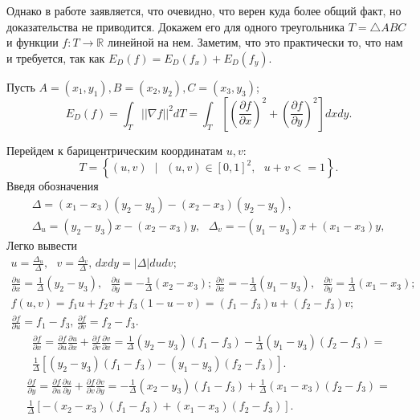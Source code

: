 Однако в работе \cite{Pinkall93} заявляется, что очевидно, что верен куда более общий факт, но доказательства не
приводится. Докажем его для одного треугольника $T = \triangle ABC$ и функции $f: T \to \mathbb{R}$ линейной
на нем. Заметим, что это практически то, что нам и требуется, так как $E_D(f) = E_D(f_x) + E_D(f_y)$. 

Пусть $A=(x_1, y_1), B=(x_2, y_2), C=(x_3, y_3)$; $$E_D(f) = \int_{T}{||\nabla{f}||^2 dT} = 
        \int_{T}{\left[\left(\frac{\partial f}{\partial x}\right)^2 + 
                       \left(\frac{\partial f}{\partial y}\right)^2 \right] dx dy}.$$ 

Перейдем к барицентрическим координатам $u, v$: $$T = \left\{(u, v)\mbox{ } | \mbox{ } (u, v) \in \left[0, 1 \right]^2 ,\mbox{ } u + v <= 1 \right\}.$$ 
Введя обозначения \begin{multline*} \Delta = (x_1 - x_3) (y_2 - y_3) - (x_2 - x_3) (y_2 - y_3), \\ \Delta_u = (y_2 - y_3) x - (x_2 - x_3) y, \mbox{ } \Delta_v = -(y_1 - y_3) x + (x_1 - x_3) y, 
\end{multline*}
Легко вывести
\begin{multline*} u = \frac{\Delta_u}{\Delta}, \mbox{ } v = \frac{\Delta_v}{\Delta} \mbox{, } dxdy = |\Delta| dudv; \\
        \frac{\partial u}{\partial x} = \frac{1}{\Delta}(y_2 - y_3), \mbox{ } \frac{\partial u}{\partial y} = -\frac{1}{\Delta}(x_2 - x_3) \mbox{; }
        \frac{\partial v}{\partial x} = -\frac{1}{\Delta}(y_1 - y_3), \mbox{ } \frac{\partial v}{\partial y} = \frac{1}{\Delta}(x_1 - x_3); \\
        f(u, v) = f_1 u + f_2 v + f_3(1-u-v) = (f_1 - f_3) u + (f_2 - f_3) v; \\
        \frac{\partial f}{\partial u} = f_1 - f_3 \mbox{, } \frac{\partial f}{\partial v} = f_2 - f_3. 
\end{multline*} 
 \begin{eqnarray*}
        \frac{\partial f}{\partial x} = \frac{\partial f}{\partial u} \frac{\partial u}{\partial x} + \frac{\partial f}{\partial v} \frac{\partial v}{\partial x} = 
            \frac{1}{\Delta}(y_2 - y_3)(f_1 - f_3) - \frac{1}{\Delta}(y_1 - y_3)(f_2 - f_3) = \\
            \frac{1}{\Delta}\left[(y_2 - y_3)(f_1 - f_3) - (y_1 - y_3)(f_2 - f_3)\right]. 
    \end{eqnarray*}
    \begin{eqnarray*}
        \frac{\partial f}{\partial y} = \frac{\partial f}{\partial u} \frac{\partial u}{\partial y} + \frac{\partial f}{\partial v} \frac{\partial v}{\partial y} = 
            -\frac{1}{\Delta}(x_2 - y_3)(f_1 - f_3) + \frac{1}{\Delta}(x_1 - x_3)(f_2 - f_3) = \\
            \frac{1}{\Delta}\left[-(x_2 - x_3)(f_1 - f_3) + (x_1 - x_3)(f_2 - f_3)\right]. 
    \end{eqnarray*}
